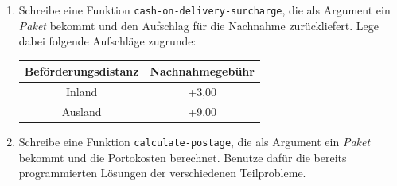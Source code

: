 \begin{aufgabe}
\begin{enumerate}
  \item Schreibe eine Funktion
    \lstinline{cash-on-delivery-surcharge}, die als Argument ein
    \textit{Paket} bekommt und den Aufschlag für die Nachnahme
    zurückliefert.  Lege dabei folgende Aufschläge zugrunde:

    \begin{center}
      \begin{tabular}{c|c}
        Beförderungsdistanz & Nachnahmegebühr \\
        \hline
        Inland & +3,00 \\
        Ausland & +9,00 \\
      \end{tabular}
    \end{center}

  \item Schreibe eine Funktion \lstinline{calculate-postage}, die
    als Argument ein \textit{Paket} bekommt und die Portokosten
    berechnet.  Benutze dafür die bereits programmierten
    Lösungen der verschiedenen Teilprobleme.
    
  \end{enumerate}
  
\end{aufgabe}

